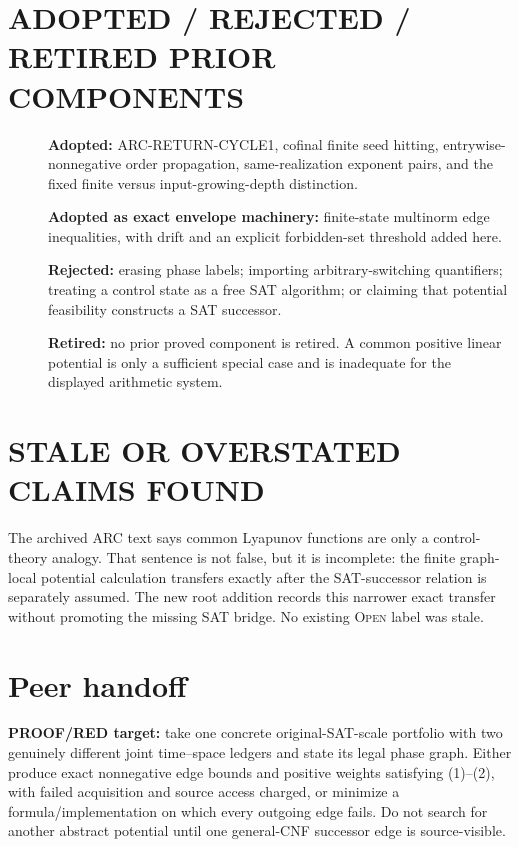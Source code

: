 \documentclass[11pt]{article}
\begin{document}
\section{ADOPTED / REJECTED / RETIRED PRIOR COMPONENTS}
\begin{description}
\item[] \textbf{Adopted:} ARC-RETURN-CYCLE1, cofinal finite seed hitting,
entrywise-nonnegative order propagation, same-realization exponent pairs, and
the fixed finite versus input-growing-depth distinction.
\item[] \textbf{Adopted as exact envelope machinery:} finite-state
multinorm edge inequalities, with drift and an explicit forbidden-set
threshold added here.
\item[] \textbf{Rejected:} erasing phase labels; importing arbitrary-switching
quantifiers; treating a control state as a free SAT algorithm; or claiming
that potential feasibility constructs a SAT successor.
\item[] \textbf{Retired:} no prior proved component is retired.  A common
positive linear potential is only a sufficient special case and is inadequate
for the displayed arithmetic system.
\end{description}

\section{STALE OR OVERSTATED CLAIMS FOUND}
The archived ARC text says common Lyapunov functions are only a control-theory
analogy.  That sentence is not false, but it is incomplete: the finite
graph-local potential calculation transfers exactly after the SAT-successor
relation is separately assumed.  The new root addition records this narrower
exact transfer without promoting the missing SAT bridge.  No existing
\textsc{Open} label was stale.

\section{Peer handoff}
\textbf{PROOF/RED target:} take one concrete original-SAT-scale portfolio
with two genuinely different joint time--space ledgers and state its legal
phase graph.  Either produce exact nonnegative edge bounds and positive
weights satisfying (1)--(2), with failed acquisition and source access
charged, or minimize a formula/implementation on which every outgoing edge
fails.  Do not search for another abstract potential until one general-CNF
successor edge is source-visible.



\end{document}
